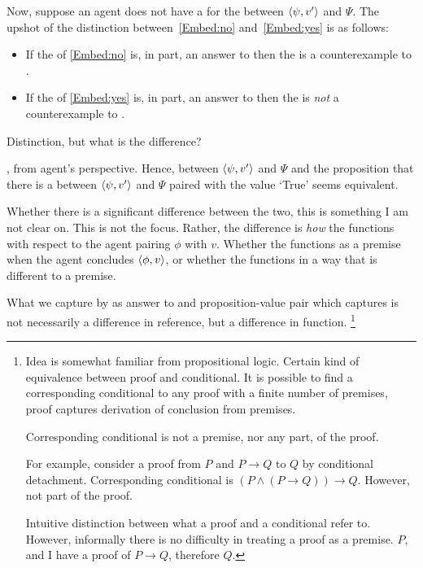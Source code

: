 \begin{note}
  Now, suppose an agent does not have a  for the \ros{} between \(\langle \psi, v' \rangle\) and \(\Psi\).
  The upshot of the distinction between~\ref{Embed:no} and~\ref{Embed:yes} is as follows:

  \begin{itemize}
  \item
    If the  of \ref{Embed:no} is, in part, an answer to \qWhyVnP{} then the  is a counterexample to \issueConstraint{}.
  \item
    If the  of \ref{Embed:yes} is, in part, an answer to \qWhyVnP{} then the  is \emph{not} a counterexample to \issueConstraint{}.
  \end{itemize}

  Distinction, but what is the difference?

  \ros{}, from agent's perspective.
  Hence, \ros{} between \(\langle \psi, v' \rangle\) and \(\Psi\) and the proposition that there is a \ros{} between \(\langle \psi, v' \rangle\) and \(\Psi\) paired with the value `True' seems equivalent.

  Whether there is a significant difference between the two, this is something I am not clear on.
  This is not the focus.
  Rather, the difference is \emph{how} the \ros{} functions with respect to the agent pairing \(\phi\) with \(v\).
  Whether the \ros{} functions as a premise when the agent concludes \(\langle \phi, v \rangle\), or whether the \ros{} functions in a way that is different to a premise.

  What we capture by \ros{} as answer to \qWhyVnP{} and proposition-value pair which captures \ros{} is not necessarily a difference in reference, but a difference in function.%
  \footnote{
    Idea is somewhat familiar from propositional logic.
    Certain kind of equivalence between proof and conditional.
    It is possible to find a corresponding conditional to any proof with a finite number of premises, proof captures derivation of conclusion from premises.

    Corresponding conditional is not a premise, nor any part, of the proof.

    For example, consider a proof from \(P\) and \(P \rightarrow Q\) to \(Q\) by conditional detachment.
    Corresponding conditional is \((P \land (P \rightarrow Q)) \rightarrow Q\).
    However, not part of the proof.

    Intuitive distinction between what a proof and a conditional refer to.
    However, informally there is no difficulty in treating a proof as a premise.
    \(P\), and I have a proof of \(P \rightarrow Q\), therefore \(Q\).
  }
\end{note}

